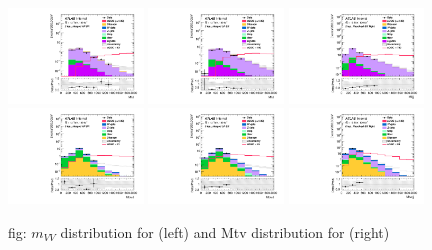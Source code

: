 \begin{figure}[ht]
    \centering
    	\includegraphics[width=0.32\textwidth]{figures/aQGC/MVV/Region_distMllJ_DSRVBSHP_BMin0_J0_incJet1_L2_T0_incFat1_Y6051_incTag1_Fat1_Prefitlog.pdf}
    \includegraphics[width=0.32\textwidth]{figures/aQGC/MVV/Region_distMllJ_DSRVBSLP_BMin0_J0_incJet1_L2_T0_incFat1_Y6051_incTag1_Fat1_Prefitlog.pdf}
  \includegraphics[width=0.32\textwidth]{figures/aQGC/MVV/Region_distMlljj_DSRVBSFid_BMin0_T0_Y6051_incTag1_J2_L2_incJet1_Prefitlog.pdf}
    	\includegraphics[width=0.32\textwidth]{figures/aQGC/MVV/Region_distMtvvJ_DSRVBSHP_BMin0_J0_incJet1_L0_T0_incFat1_Y6051_incTag1_Fat1_Prefitlog.pdf}
    \includegraphics[width=0.32\textwidth]{figures/aQGC/MVV/Region_distMtvvJ_DSRVBSLP_BMin0_J0_incJet1_L0_T0_incFat1_Y6051_incTag1_Fat1_Prefitlog.pdf}
 \includegraphics[width=0.32\textwidth]{figures/aQGC/MVV/Region_distMtvvjj_DSRVBSFid_BMin0_T0_Y6051_incTag1_J2_L0_incJet1_Prefitlog.pdf}
        \caption{fig: $m_{VV}$ distribution for \tlep (left) and Mtv distribution for \zlep (right)}
        \label{fig:mVVdist}
\end{figure}

